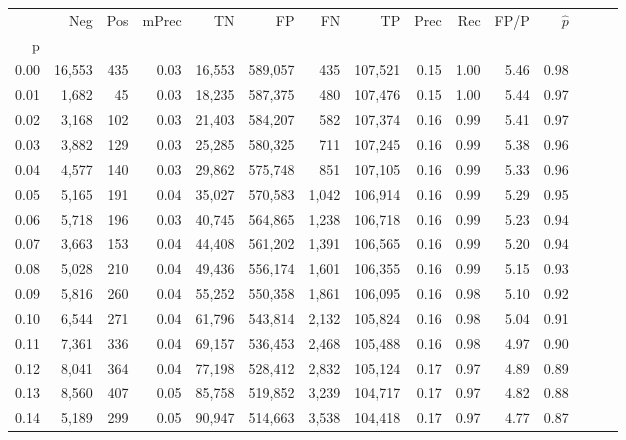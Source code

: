 \begin{tabular}{rrrrrrrrrrrrrrr}
\toprule
{} &     Neg &    Pos & mPrec &       TN &       FP &       FN &       TP &  Prec &   Rec &  FP/P & $\hat{p}$ \\
p    &         &        &       &          &          &          &          &       &       &       &           \\
\midrule
0.00 &  16,553 &    435 &  0.03 &   16,553 &  589,057 &      435 &  107,521 &  0.15 &  1.00 &  5.46 &      0.98 \\
0.01 &   1,682 &     45 &  0.03 &   18,235 &  587,375 &      480 &  107,476 &  0.15 &  1.00 &  5.44 &      0.97 \\
0.02 &   3,168 &    102 &  0.03 &   21,403 &  584,207 &      582 &  107,374 &  0.16 &  0.99 &  5.41 &      0.97 \\
0.03 &   3,882 &    129 &  0.03 &   25,285 &  580,325 &      711 &  107,245 &  0.16 &  0.99 &  5.38 &      0.96 \\
0.04 &   4,577 &    140 &  0.03 &   29,862 &  575,748 &      851 &  107,105 &  0.16 &  0.99 &  5.33 &      0.96 \\
0.05 &   5,165 &    191 &  0.04 &   35,027 &  570,583 &    1,042 &  106,914 &  0.16 &  0.99 &  5.29 &      0.95 \\
0.06 &   5,718 &    196 &  0.03 &   40,745 &  564,865 &    1,238 &  106,718 &  0.16 &  0.99 &  5.23 &      0.94 \\
0.07 &   3,663 &    153 &  0.04 &   44,408 &  561,202 &    1,391 &  106,565 &  0.16 &  0.99 &  5.20 &      0.94 \\
0.08 &   5,028 &    210 &  0.04 &   49,436 &  556,174 &    1,601 &  106,355 &  0.16 &  0.99 &  5.15 &      0.93 \\
0.09 &   5,816 &    260 &  0.04 &   55,252 &  550,358 &    1,861 &  106,095 &  0.16 &  0.98 &  5.10 &      0.92 \\
0.10 &   6,544 &    271 &  0.04 &   61,796 &  543,814 &    2,132 &  105,824 &  0.16 &  0.98 &  5.04 &      0.91 \\
0.11 &   7,361 &    336 &  0.04 &   69,157 &  536,453 &    2,468 &  105,488 &  0.16 &  0.98 &  4.97 &      0.90 \\
0.12 &   8,041 &    364 &  0.04 &   77,198 &  528,412 &    2,832 &  105,124 &  0.17 &  0.97 &  4.89 &      0.89 \\
0.13 &   8,560 &    407 &  0.05 &   85,758 &  519,852 &    3,239 &  104,717 &  0.17 &  0.97 &  4.82 &      0.88 \\
0.14 &   5,189 &    299 &  0.05 &   90,947 &  514,663 &    3,538 &  104,418 &  0.17 &  0.97 &  4.77 &      0.87 \\

\end{tabular}
